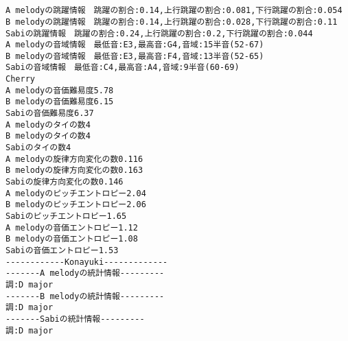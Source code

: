 \documentclass[11pt]{article}
\begin{document}
    \begin{center}
    \end{center}
    { \hspace*{\fill} \\}
    
    \begin{center}
    \end{center}
    { \hspace*{\fill} \\}
    
    \begin{Verbatim}[commandchars=\\\{\}]
A melodyの跳躍情報　跳躍の割合:0.14,上行跳躍の割合:0.081,下行跳躍の割合:0.054
B melodyの跳躍情報　跳躍の割合:0.14,上行跳躍の割合:0.028,下行跳躍の割合:0.11
Sabiの跳躍情報　跳躍の割合:0.24,上行跳躍の割合:0.2,下行跳躍の割合:0.044
A melodyの音域情報　最低音:E3,最高音:G4,音域:15半音(52-67)
B melodyの音域情報　最低音:E3,最高音:F4,音域:13半音(52-65)
Sabiの音域情報　最低音:C4,最高音:A4,音域:9半音(60-69)
Cherry
A melodyの音価難易度5.78
B melodyの音価難易度6.15
Sabiの音価難易度6.37
A melodyのタイの数4
B melodyのタイの数4
Sabiのタイの数4
A melodyの旋律方向変化の数0.116
B melodyの旋律方向変化の数0.163
Sabiの旋律方向変化の数0.146
A melodyのピッチエントロピー2.04
B melodyのピッチエントロピー2.06
Sabiのピッチエントロピー1.65
A melodyの音価エントロピー1.12
B melodyの音価エントロピー1.08
Sabiの音価エントロピー1.53
------------Konayuki-------------
-------A melodyの統計情報---------
調:D major
-------B melodyの統計情報---------
調:D major
-------Sabiの統計情報---------
調:D major

    \end{Verbatim}

    \begin{center}
    \end{center}
    { \hspace*{\fill} \\}
    
    \begin{center}
    \end{center}
    { \hspace*{\fill} \\}
    
\end{document}
